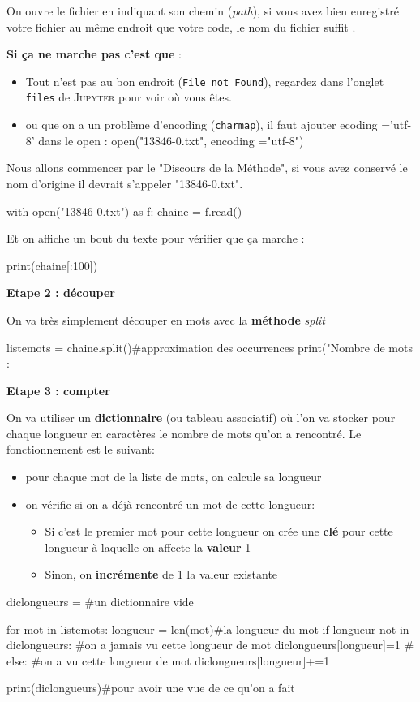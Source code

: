 On ouvre le fichier en indiquant son chemin (\textit{path}), si vous
avez bien enregistré votre fichier au même endroit que votre code,
le nom du fichier suffit .

\textbf{Si ça ne marche pas c'est que} : 
\begin{itemize}
\item Tout n'est pas au bon endroit (\texttt{File not Found}), regardez
dans l'onglet \texttt{files} de \textsc{Jupyter} pour voir où vous
êtes. 
\item ou que on a un problème d'encoding (\texttt{charmap}), il faut ajouter
ecoding ='utf-8' dans le open : open("13846-0.txt", encoding ="utf-8") 
\end{itemize}
Nous allons commencer par le "Discours de la Méthode", si vous avez
conservé le nom d'origine il devrait s'appeler "13846-0.txt".

\begin{python} with open("13846-0.txt") as f: chaine = f.read()
\end{python}

Et on affiche un bout du texte pour vérifier que ça marche :

\begin{python} print(chaine{[}:100{]}) \end{python}

\textbf{Etape 2 : découper}

On va très simplement découper en mots avec la \textbf{méthode} \textit{split}
\begin{python} listemots = chaine.split()\#approximation des occurrences
print("Nombre de mots : %
\end{python}

\textbf{Etape 3 : compter}

On va utiliser un \textbf{dictionnaire} (ou tableau associatif) où
l'on va stocker pour chaque longueur en caractères le nombre de mots
qu'on a rencontré. Le fonctionnement est le suivant: 
\begin{itemize}
\item pour chaque mot de la liste de mots, on calcule sa longueur 
\item on vérifie si on a déjà rencontré un mot de cette longueur: 
\begin{itemize}
\item Si c'est le premier mot pour cette longueur on crée une \textbf{clé}
pour cette longueur à laquelle on affecte la \textbf{valeur} 1 
\item Sinon, on \textbf{incrémente} de 1 la valeur existante 
\end{itemize}
\end{itemize}
\begin{python} diclongueurs = {} \#un dictionnaire vide

for mot in listemots: longueur = len(mot)\#la longueur du mot if longueur
not in diclongueurs: \#on a jamais vu cette longueur de mot diclongueurs{[}longueur{]}=1
\# else: \#on a vu cette longueur de mot diclongueurs{[}longueur{]}+=1

print(diclongueurs)\#pour avoir une vue de ce qu'on a fait

\end{python}

